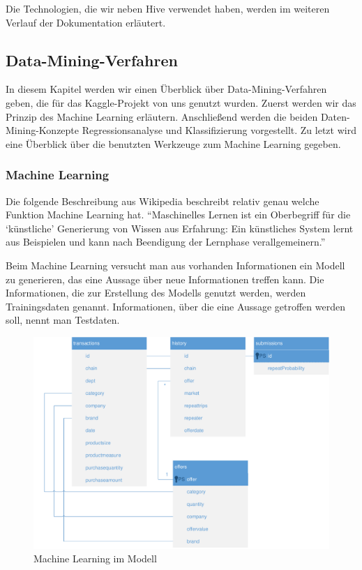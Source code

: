 Die Technologien, die wir neben Hive verwendet haben, werden im weiteren Verlauf der Dokumentation erläutert.


\subsection{Data-Mining-Verfahren}
In diesem Kapitel werden wir einen Überblick über Data-Mining-Verfahren geben, die für das Kaggle-Projekt von uns genutzt wurden. Zuerst werden wir das Prinzip des Machine Learning erläutern. Anschließend werden die beiden Daten-Mining-Konzepte Regressionsanalyse und Klassifizierung vorgestellt. Zu letzt wird eine Überblick über die benutzten Werkzeuge zum Machine Learning gegeben.

\subsubsection{Machine Learning}
Die folgende Beschreibung aus Wikipedia beschreibt relativ genau welche Funktion Machine Learning hat. “Maschinelles Lernen ist ein Oberbegriff für die ‘künstliche’ Generierung von Wissen aus Erfahrung: Ein künstliches System lernt aus Beispielen und kann nach Beendigung der Lernphase verallgemeinern.”

Beim Machine Learning versucht man aus vorhanden Informationen ein Modell zu generieren, das eine Aussage über neue Informationen treffen kann. Die Informationen, die zur Erstellung des Modells genutzt werden, werden Trainingsdaten genannt. Informationen, über die eine Aussage getroffen werden soll, nennt man Testdaten.

\begin{figure}[H]
\centering
\includegraphics[width=0.9\linewidth]{Bilder/ShoppersTables}
\caption{Machine Learning im Modell}
\label{fig:MachineLearning}
\end{figure}


